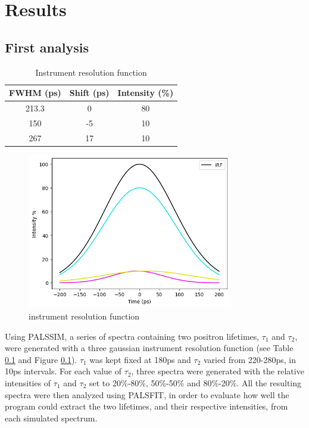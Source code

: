 \chapter*{Results}

\section{First analysis}

\begin{table}
    \caption{Instrument resolution function}
    \centering
    \begin{tabular}{|c|c|c|}
        \hline
        FWHM (ps) &  Shift (ps) & Intensity (\%) \\
        \hline
        213.3 & 0 & 80\\ 
        150 & -5 & 10\\ 
        267 & 17 & 10\\  
        \hline
    \end{tabular}
    \label{tab:irf}
\end{table}

\begin{figure}
    \centering
    \includegraphics[width=0.8\textwidth]{Batch 3/regular IRF/irf.png}
    \caption{instrument resolution function}
    \label{fig:irf}
\end{figure}

Using PALSSIM, a series of spectra containing two positron lifetimes, $\tau_1$ and $\tau_2$, were generated with a three gaussian instrument resolution function (see Table \ref{tab:irf} and Figure \ref{fig:irf}). $\tau_1$ was kept fixed at 180ps and $\tau_2$ varied from 220-280ps, in 10ps intervals. For each value of $\tau_2$, three spectra were generated with the relative intensities of $\tau_1$ and $\tau_2$ set to 20\%-80\%, 50\%-50\% and 80\%-20\%. All the resulting spectra were then analyzed using PALSFIT, in order to evaluate how well the program could extract the two lifetimes, and their respective intensities, from each simulated spectrum.

